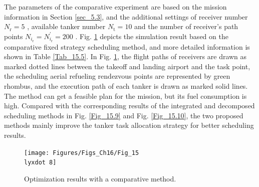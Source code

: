 The parameters of the comparative experiment are based on the mission information in Section \ref{sec_5.3}, and the additional settings of receiver number $N_\text{r}=5$ , available tanker number $N_\text{t}=10$  and the number of receiver's path points $N_{i_\text{r}}=N_{i_\text{r}}^{'}=200$ . Fig. \ref{Fig_15.8} depicts the simulation result based on the comparative fixed strategy scheduling method, and more detailed information is shown in Table \ref{Tab_15.5}. In Fig. \ref{Fig_15.8}, the flight paths of receivers are drawn as marked dotted lines between the takeoff and landing airport and the task point, the scheduling aerial refueling rendezvous points are represented by green rhombus, and the execution path of each tanker is drawn as marked solid lines. The method can get a feasible plan for the mission, but its fuel consumption is high. Compared with the corresponding results of the integrated and decomposed scheduling methods in Fig. \ref{Fig_15.9} and Fig. \ref{Fig_15.10}, the two proposed methods mainly improve the tanker task allocation strategy for better scheduling results.

\begin{figure}
	\begin{centering}
		\texttt{[image: Figures/Figs\_Ch16/Fig\_15\\lyxdot 8]}
		\par\end{centering}
	\caption{Optimization results with a comparative method.}
	\centering{}\label{Fig_15.8}
\end{figure}


